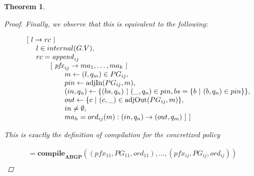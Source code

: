 \documentclass[twocolumn, openany]{sig-alternate-10pt}
\newtheorem{thm}{Theorem}
\begin{document}
\begin{thm}
\begin{proof}
  Finally, we observe that this is equivalent to the following:

  \[ \begin{array}{l}
     ~~~~~ [~ l \rightarrow rc ~\vert~ \\
     ~~~~~~~~~ l \in internal(G.V), \\
     ~~~~~~~~~ rc = \mathit{append}_{ij}~  \\
     ~~~~~~~~~~~~~~~ [~ \mathit{pfx}_{ij} \rightarrow ma_1, \dots, ma_k ~\vert~ \\
     ~~~~~~~~~~~~~~~~~~~~~ m \leftarrow (l,q_m) \in PG_{ij}, \\
     ~~~~~~~~~~~~~~~~~~~~~ pin \leftarrow \text{adjIn}(PG_{ij},m), \\
     ~~~~~~~~~~~~~~~~~~~~~ (in,q_n) \leftarrow \{ (bs,q_n) ~\vert~ (\_,q_n) \in pin, bs=\{b ~\vert~ (b,q_n) \in pin \} \}, \\
     ~~~~~~~~~~~~~~~~~~~~~ out \leftarrow \{ c ~\vert~ (c,\_) \in \text{adjOut}(PG_{ij},m) \}, \\
     ~~~~~~~~~~~~~~~~~~~~~ in \neq \emptyset, \\
     ~~~~~~~~~~~~~~~~~~~~~ ma_h = ord_{ij}(m) : (in,q_n) \rightarrow (out,q_m) ~] ~] \\
  \end{array} \]%

  This is exactly the definition of compilation for the concretized policy

  \[ \begin{array}{l}
     = \textbf{compile}_\textbf{ABGP}( (pfx_{11},PG_{11},ord_{11}), \dots, (pfx_{ij},PG_{ij},ord_{ij}) ) \\
  \end{array} \]%


  \end{proof}

\end{thm}
\end{document}
